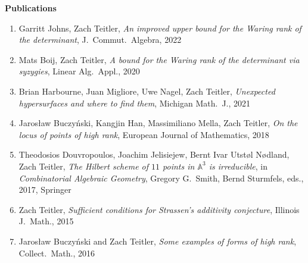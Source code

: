 \documentclass[12pt]{article}
\begin{document}





\textbf{Publications}
\begin{enumerate}[revarabic,labelwidth=*]

\item Garritt Johns, Zach Teitler,
\emph{An improved upper bound for the Waring rank of the determinant},
J.\ Commut.\ Algebra,
2022


\item Mats Boij, Zach Teitler,
\emph{A bound for the Waring rank of the determinant via syzygies},
Linear Alg.\ Appl.,
2020

\item Brian Harbourne, Juan Migliore, Uwe Nagel, Zach Teitler,
\emph{Unexpected hypersurfaces and where to find them},
Michigan Math.\ J.,
2021

\item Jaros{\l}aw Buczy\'nski, Kangjin Han, Massimiliano Mella, Zach Teitler,
\emph{On the locus of points of high rank},
European Journal of Mathematics, 2018

\item Theodosios Douvropoulos, Joachim Jelisiejew, Bernt Ivar Utst{\o}l N{\o}dland, Zach Teitler,
\emph{The Hilbert scheme of $11$ points in $\mathbb{A}^3$ is irreducible},
in \emph{Combinatorial Algebraic Geometry}, Gregory G.\ Smith, Bernd Sturmfels, eds., 2017, Springer

\item Zach Teitler,
\emph{Sufficient conditions for Strassen's additivity conjecture},
Illinois J.\ Math.,
2015

\item Jaros{\l}aw Buczy\'nski and Zach Teitler,
\emph{Some examples of forms of high rank},
Collect.\ Math.,
2016


\end{enumerate}
\end{document}
